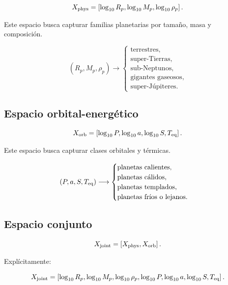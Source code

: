\documentclass[11pt,letterpaper]{article}
\newcommand{\Rp}{R_p}
\newcommand{\Mp}{M_p}
\newcommand{\rhop}{\rho_p}
\newcommand{\Teq}{T_{\rm eq}}
\newcommand{\phys}{\rm phys}
\newcommand{\orb}{\rm orb}
\newcommand{\joint}{\rm joint}
\begin{document}
\begin{equation}
X_{\phys}=\left[\log_{10}\Rp,\log_{10}\Mp,\log_{10}\rhop\right].
\end{equation}

Este espacio busca capturar familias planetarias por tamaño, masa y composición.

\begin{equation}
(\Rp,\Mp,\rhop)\longrightarrow
\begin{cases}
\text{terrestres},\\
\text{super-Tierras},\\
\text{sub-Neptunos},\\
\text{gigantes gaseosos},\\
\text{super-Júpiteres}.
\end{cases}
\end{equation}

\subsection{Espacio orbital-energético}

\begin{equation}
X_{\orb}=\left[\log_{10}P,\log_{10}a,\log_{10}S,\Teq\right].
\end{equation}

Este espacio busca capturar clases orbitales y térmicas.

\begin{equation}
(P,a,S,\Teq)\longrightarrow
\begin{cases}
\text{planetas calientes},\\
\text{planetas cálidos},\\
\text{planetas templados},\\
\text{planetas fríos o lejanos}.
\end{cases}
\end{equation}

\subsection{Espacio conjunto}

\begin{equation}
X_{\joint}=\left[X_{\phys},X_{\orb}\right].
\end{equation}

Explícitamente:

\begin{equation}
X_{\joint}=\left[\log_{10}\Rp,\log_{10}\Mp,\log_{10}\rhop,\log_{10}P,\log_{10}a,\log_{10}S,\Teq\right].
\end{equation}
\end{document}
